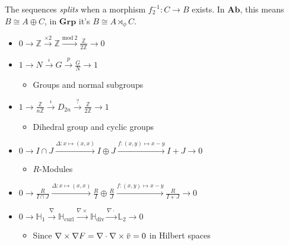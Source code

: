 \begin{definition}

The sequences \emph{splits} when a morphism \(f_2^{-1}: C \to B\)
exists. In \(\textbf{Ab}\), this means \(B \cong A \oplus C\), in
\(\mathbf{Grp}\) it's \(B \cong A \rtimes_\phi C\).

\end{definition}

\begin{example}

\envlist

\begin{itemize}
\tightlist
\item
  \(0 \to{\mathbb{Z}}\xrightarrow{\times 2} {\mathbb{Z}}\xrightarrow{\text{mod}~2} \frac{{\mathbb{Z}}}{2{\mathbb{Z}}} \to 0\)
\item
  \(1 \to N \xrightarrow{\iota} G \xrightarrow{p} \frac{G}{N} \to 1\)

  \begin{itemize}
  \tightlist
  \item
    Groups and normal subgroups
  \end{itemize}
\item
  \(1 \to\frac{{\mathbb{Z}}}{n{\mathbb{Z}}} \xrightarrow{\iota} D_{2n} \xrightarrow{?} \frac{{\mathbb{Z}}}{2{\mathbb{Z}}} \to 1\)

  \begin{itemize}
  \tightlist
  \item
    Dihedral group and cyclic groups
  \end{itemize}
\item
  \(0 \to I \cap J \xrightarrow{\Delta: x\mapsto(x,x)} I \oplus J \xrightarrow{f:(x,y) \mapsto x-y} I + J \to 0\)

  \begin{itemize}
  \tightlist
  \item
    \(R\)-Modules
  \end{itemize}
\item
  \(0 \to\frac{R}{I \cap J} \xrightarrow{\Delta: x\mapsto(x,x)} \frac{R}{I} \oplus \frac{R}{J} \xrightarrow{f:(x,y) \mapsto x-y} \frac{R}{I + J} \to 0\)
\item
  \(0 \to\mathbb{H}_1 \xrightarrow{\nabla} \mathbb{H}_\text{curl} \xrightarrow{\nabla \times} \mathbb{H}_\text{div} \xrightarrow{\nabla \cdot} \mathbb{L}_2 \to 0\)

  \begin{itemize}
  \tightlist
  \item
    Since
    \(\nabla \times\nabla F = \nabla \cdot\nabla\times\mkern 1.5mu\overline{\mkern-1.5muv\mkern-1.5mu}\mkern 1.5mu = 0\)
    in Hilbert spaces
  \end{itemize}
\end{itemize}

\end{example}

